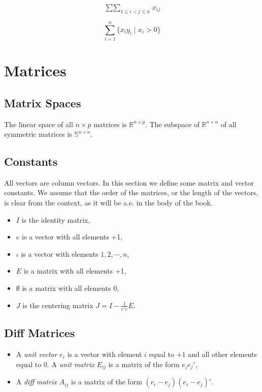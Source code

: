 \documentclass[
  12pt,
]{book}
\providecommand{\tightlist}{%
  \setlength{\itemsep}{0pt}\setlength{\parskip}{0pt}}
\theoremstyle{definition}
\theoremstyle{definition}
\theoremstyle{definition}
\theoremstyle{definition}
\theoremstyle{remark}
\begin{document}
\[\mathop{\sum\sum}_{1\leq i<j\leq n} x_{ij}\]

\[\sum_{i=1}^n\{x_iy_i\mid x_i > 0\}\]

\hypertarget{apmatrices}{%
\section{Matrices}\label{apmatrices}}

\hypertarget{apmspaces}{%
\subsection{Matrix Spaces}\label{apmspaces}}

The linear space of all \(n\times p\) matrices is \(\mathbb{R}^{n\times p}\). The subspace of \(\mathbb{R}^{n\times n}\) of all symmetric matrices is \(\mathbb{S}^{n\times n}\).

\hypertarget{apconstants}{%
\subsection{Constants}\label{apconstants}}

All vectors are column vectors. In this section we define some matrix and vector constants. We assume that the order of the matrices, or the length of the vectors, is clear from the context, as it will be a.e. in the body of the book.

\begin{itemize}
\tightlist
\item
  \(I\) is the identity matrix,
\item
  \(e\) is a vector with all elements +1,
\item
  \(\iota\) is a vector with elements \(1,2,\cdots,n\),
\item
  \(E\) is a matrix with all elements +1,
\item
  \(\emptyset\) is a matrix with all elements 0,
\item
  \(J\) is the centering matrix \(J=I-\frac{1}{e'e}E\).
\end{itemize}

\hypertarget{difmat}{%
\subsection{Diff Matrices}\label{difmat}}

\begin{itemize}
\item
  A \emph{unit vector} \(e_i\) is a vector with element \(i\) equal to \(+1\) and all other elements equal to 0. A \emph{unit matrix} \(E_{ij}\) is a matrix of the form \(e_i^{\ }e_j'\),
\item
  A \emph{diff matrix} \(A_{ij}\) is a matrix of the form \((e_i-e_j)(e_i-e_j)'\).
\end{itemize}
\end{document}
